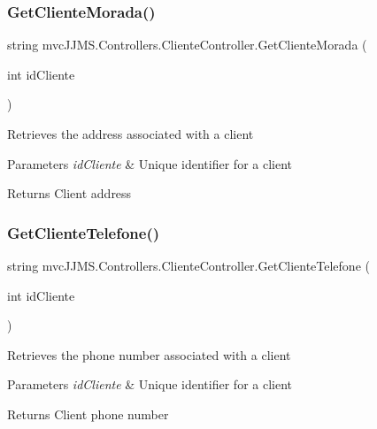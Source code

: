 \subsubsection{\texorpdfstring{Get\+Cliente\+Morada()}{GetClienteMorada()}}
{\footnotesize\ttfamily string mvc\+J\+J\+M\+S.\+Controllers.\+Cliente\+Controller.\+Get\+Cliente\+Morada (\begin{DoxyParamCaption}\item[{int}]{id\+Cliente }\end{DoxyParamCaption})\hspace{0.3cm}{\ttfamily [inline]}}



Retrieves the address associated with a client 


\begin{DoxyParams}{Parameters}
{\em id\+Cliente} & Unique identifier for a client\\
\hline
\end{DoxyParams}
\begin{DoxyReturn}{Returns}
Client address
\end{DoxyReturn}
\mbox{\label{classmvc_j_j_m_s_1_1_controllers_1_1_cliente_controller_ac50b76017495e8df860bffad1e7ea29f}} 
\subsubsection{\texorpdfstring{Get\+Cliente\+Telefone()}{GetClienteTelefone()}}
{\footnotesize\ttfamily string mvc\+J\+J\+M\+S.\+Controllers.\+Cliente\+Controller.\+Get\+Cliente\+Telefone (\begin{DoxyParamCaption}\item[{int}]{id\+Cliente }\end{DoxyParamCaption})\hspace{0.3cm}{\ttfamily [inline]}}



Retrieves the phone number associated with a client 


\begin{DoxyParams}{Parameters}
{\em id\+Cliente} & Unique identifier for a client\\
\hline
\end{DoxyParams}
\begin{DoxyReturn}{Returns}
Client phone number
\end{DoxyReturn}
\mbox{\label{classmvc_j_j_m_s_1_1_controllers_1_1_cliente_controller_afa8996759fcf65477a9aac44cd0c9810}} 
